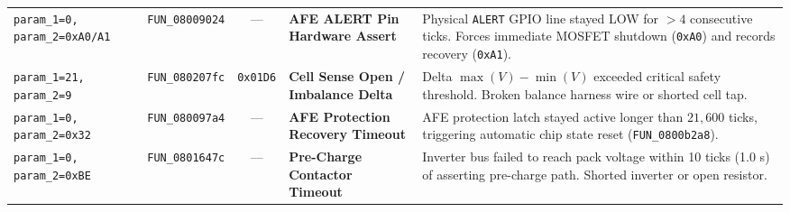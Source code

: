 \documentclass[10pt,a4paper]{article}
\begin{document}
\begin{longtable}{llcp{3.2cm}p{5.5cm}}
\texttt{param\_1=0, param\_2=0xA0/A1} & \texttt{FUN\_08009024} & --- & \textbf{AFE ALERT Pin Hardware Assert} & Physical \texttt{ALERT} GPIO line stayed LOW for $>4$ consecutive ticks. Forces immediate MOSFET shutdown (\texttt{0xA0}) and records recovery (\texttt{0xA1}). \\
\texttt{param\_1=21, param\_2=9} & \texttt{FUN\_080207fc} & \texttt{0x01D6} & \textbf{Cell Sense Open / Imbalance Delta} & Delta $\max(V) - \min(V)$ exceeded critical safety threshold. Broken balance harness wire or shorted cell tap. \\
\texttt{param\_1=0, param\_2=0x32} & \texttt{FUN\_080097a4} & --- & \textbf{AFE Protection Recovery Timeout} & AFE protection latch stayed active longer than $21,600$ ticks, triggering automatic chip state reset (\texttt{FUN\_0800b2a8}). \\
\texttt{param\_1=0, param\_2=0xBE} & \texttt{FUN\_0801647c} & --- & \textbf{Pre-Charge Contactor Timeout} & Inverter bus failed to reach pack voltage within 10 ticks (1.0 s) of asserting pre-charge path. Shorted inverter or open resistor. \\
\end{longtable}
\end{document}
